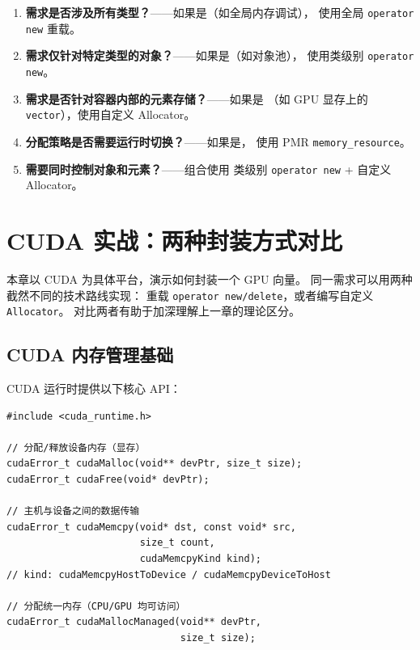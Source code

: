 \documentclass[12pt,a4paper,fontset=fandol]{ctexbook}
\begin{document}
\begin{enumerate}
    \item \textbf{需求是否涉及所有类型？}——如果是（如全局内存调试），
          使用全局 \texttt{operator new} 重载。
    \item \textbf{需求仅针对特定类型的对象？}——如果是（如对象池），
          使用类级别 \texttt{operator new}。
    \item \textbf{需求是否针对容器内部的元素存储？}——如果是
          （如 GPU 显存上的 \texttt{vector}），使用自定义 Allocator。
    \item \textbf{分配策略是否需要运行时切换？}——如果是，
          使用 PMR \texttt{memory\_resource}。
    \item \textbf{需要同时控制对象和元素？}——组合使用
          类级别 \texttt{operator new} + 自定义 Allocator。
\end{enumerate}


\chapter{CUDA 实战：两种封装方式对比}

本章以 CUDA 为具体平台，演示如何封装一个 GPU 向量。
同一需求可以用两种截然不同的技术路线实现：
重载 \texttt{operator new/delete}，或者编写自定义 \texttt{Allocator}。
对比两者有助于加深理解上一章的理论区分。

\section{CUDA 内存管理基础}

CUDA 运行时提供以下核心 API：

\begin{lstlisting}
#include <cuda_runtime.h>

// 分配/释放设备内存（显存）
cudaError_t cudaMalloc(void** devPtr, size_t size);
cudaError_t cudaFree(void* devPtr);

// 主机与设备之间的数据传输
cudaError_t cudaMemcpy(void* dst, const void* src,
                       size_t count,
                       cudaMemcpyKind kind);
// kind: cudaMemcpyHostToDevice / cudaMemcpyDeviceToHost

// 分配统一内存（CPU/GPU 均可访问）
cudaError_t cudaMallocManaged(void** devPtr,
                              size_t size);
\end{lstlisting}
\end{document}
